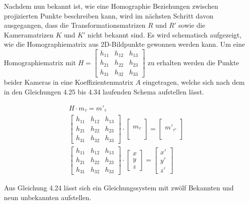 Nachdem nun bekannt ist, wie eine Homographie Beziehungen zwischen projizierten Punkte beschreiben kann, wird im nächsten Schritt davon ausgegangen, dass die Transformationsmatrizen $R$ und $R'$ sowie die Kameramatrizen $K$ und $K'$ nicht bekannt sind. Es wird schematisch aufgezeigt, wie die Homographiematrix aus 2D-Bildpunkte gewonnen werden kann. Um eine Homographiematrix mit 
$H=
\begin{bmatrix}
h_{11}&h_{12}&h_{13}\\
h_{21}&h_{22}&h_{23}\\
h_{31}&h_{32}&h_{33}
\end{bmatrix}
$ zu erhalten werden die Punkte beider Kameras in eine Koeffizientenmatrix $A$ eingetragen, welche sich nach dem in den Gleichungen 4.25 bis 4.34 laufenden Schema aufstellen lässt. 

\begin{gather}
	H\cdot m_\tau = m'_{\tau}\\
	\begin{bmatrix}
		h_{11}&h_{12}&h_{13}\\
		h_{21}&h_{22}&h_{23}\\
		h_{31}&h_{32}&h_{33}
	\end{bmatrix}
	\cdot
	\begin{bmatrix}
		\\m_\tau\\\\
	\end{bmatrix}
	=
	\begin{bmatrix}
		\\m'_{\tau'}\\\\
	\end{bmatrix}\\
	\begin{bmatrix}
		h_{11}&h_{12}&h_{13}\\
		h_{21}&h_{22}&h_{23}\\
		h_{31}&h_{32}&h_{33}
	\end{bmatrix}
	\cdot
	\begin{bmatrix}
		x\\y\\z
	\end{bmatrix}
	=
	\begin{bmatrix}
		x'\\y'\\z'
	\end{bmatrix}
\end{gather}

Aus Gleichung 4.24 lässt sich ein Gleichungssystem mit zwölf Bekannten und neun unbekannten aufstellen.  

